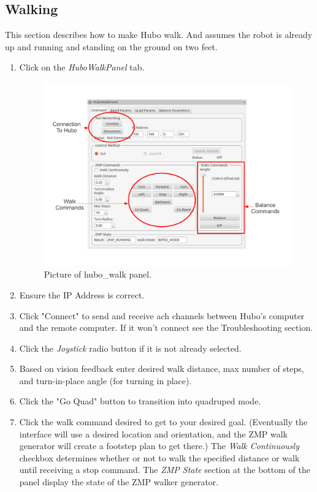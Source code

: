 \documentclass[letterpaper, 10 pt]{report}
\begin{document}
\subsection*{Walking}
This section describes how to make Hubo walk. And assumes the robot is already up and running and standing on the ground on two feet.
  \begin{enumerate}
    \item Click on the \textit{HuboWalkPanel} tab.
    \begin{figure}[ht]
      \centering
      \includegraphics[width=15.0cm]{resources/hubo-walk.pdf}
      \caption{Picture of hubo\_walk panel.}
      \label{fig:hubo-walk-image}
    \end{figure}
    \item Ensure the IP Address is correct.
    \item Click "Connect" to send and receive ach channels between Hubo's computer and the remote computer. If it won't connect see the Troubleshooting section.
    \item Click the \textit{Joystick} radio button if it is not already selected.
    \item Based on vision feedback enter desired walk distance, max number of steps, and turn-in-place angle (for turning in place).
    \item Click the "Go Quad" button to transition into quadruped mode.
    \item Click the walk command desired to get to your desired goal. (Eventually the interface will use a desired location and orientation, and the ZMP walk generator will create a footstep plan to get there.) The \textit{Walk Continuously} checkbox determines whether or not to walk the specified distance or walk until receiving a stop command. The \textit{ZMP State} section at the bottom of the panel display the state of the ZMP walker generator.

\end{enumerate}
\end{document}
